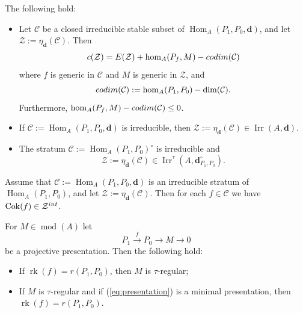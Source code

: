 \documentclass[10pt,a4paper]{amsart}
\newcommand{\Coker}{\operatorname{Cok}}
\newcommand{\Hom}{\operatorname{Hom}}
\newcommand{\bd}{\mathbf{d}}
\newcommand{\cC}{{\mathcal C}}
\newcommand{\calZ}{\mathcal{Z}}
\newcommand{\irr}{\operatorname{Irr}}
\newcommand{\md}{\operatorname{mod}}
\newcommand{\rk}{\operatorname{rk}}
\begin{document}
\begin{Thm}\label{thm:bundle1}
The following hold:
\begin{itemize}\itemsep2mm

\item[(i)]
Let $\cC$ be a closed irreducible stable subset of
$\Hom_A(P_1,P_0,\bd)$, and let $\calZ := \eta_\bd(\cC)$.
Then
$$
c(\calZ) = E(\calZ) + \hom_A(P_f,M) - {\rm codim}(\cC)
$$
where $f$ is generic in $\cC$ and $M$ is generic in $\calZ$, and
$$
{\rm codim}(\cC) := \hom_A(P_1,P_0) - \dim(\cC).
$$
Furthermore,
$\hom_A(P_f,M) - {\rm codim}(\cC) \le 0$.

\item[(ii)]
If $\cC := \Hom_A(P_1,P_0,\bd)$ is irreducible, then
$\calZ := \eta_\bd(\cC) \in \irr(A,\bd)$.

\item[(iii)]
The stratum
$\cC := \Hom_A(P_1,P_0)^\circ$ is irreducible and
$$
\calZ := \eta_\bd(\cC) \in \irr^\tau(A,\bd_{P_1,P_0}^\circ).
$$

\end{itemize}
\end{Thm}

\begin{Lem}\label{lem:bundle6}
Assume that $\cC := \Hom_A(P_1,P_0,\bd)$ is an irreducible stratum of
$\Hom_A(P_1,P_0)$, and let
$\calZ := \eta_\bd(\cC)$.
Then for each $f \in \cC$ we have $\Coker(f) \in \calZ^{\rm int}$.
\end{Lem}

\begin{Thm}\label{thm:main0b}
For $M \in \md(A)$ let
\begin{equation}\label{eq:presentation}
P_1 \xrightarrow{f} P_0 \to M \to 0
\end{equation}
be a projective presentation.
Then
the following hold:
\begin{itemize}\itemsep2mm

\item[(i)]
If $\rk(f) = r(P_1,P_0)$, then $M$ is $\tau$-regular;

\item[(ii)]
If $M$ is $\tau$-regular and if (\ref{eq:presentation}) is a minimal presentation,
then $\rk(f) = r(P_1,P_0)$.

\end{itemize}
\end{Thm}
\end{document}
